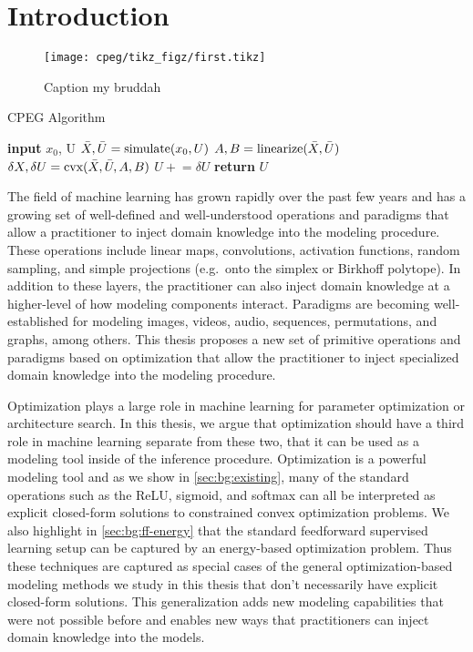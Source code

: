 \chapter{Introduction}

\begin{figure}
    \centering
    \texttt{[image: cpeg/tikz\_figz/first.tikz]}
    \caption{Caption my bruddah}
    \label{fig:enter-label}
\end{figure}

  \begin{algorithm} 
	\begin{algorithmic}[1]
		\caption{CPEG Algorithm}\label{alg:flight}
		\State \textbf{input} $x_0$, U  
    		\State $\Bar{X}, \Bar{U} = \text{simulate}(x_0,U)$ 
    		\State $A,B = \text{linearize}(\Bar{X}, \Bar{U})$ 
    		\State $\delta X,\delta U = \text{cvx}(\Bar{X}, \Bar{U}, A, B)$  
    	    \State $U \mathrel{+}= \delta U $ 
		\EndWhile
		\State \textbf{return} $U$ 
	\end{algorithmic}
\end{algorithm}

The field of machine learning has grown rapidly over the past few
years and has a growing set of well-defined and
well-understood operations and paradigms that allow
a practitioner to inject domain
knowledge into the modeling procedure.
These operations include linear maps, convolutions,
activation functions, random sampling, and
simple projections (e.g.~onto the simplex or Birkhoff polytope).
In addition to these layers, the practitioner can also
inject domain knowledge at a higher-level of
how modeling components interact.
Paradigms are becoming well-established for modeling
images, videos, audio, sequences, permutations, and graphs,
among others.
This thesis proposes a new set of primitive operations and
paradigms based on optimization that allow the practitioner
to inject specialized domain knowledge into the modeling procedure.

Optimization plays a large role in machine learning for
parameter optimization or architecture search.
In this thesis, we argue that optimization should have a third
role in machine learning separate from these two,
that it can be used as a modeling tool inside of
the inference procedure.
Optimization is a powerful modeling tool and as we show in
\cref{sec:bg:existing}, many of the standard operations such
as the ReLU, sigmoid, and softmax can all be interpreted
as explicit closed-form solutions to constrained convex
optimization problems.
We also highlight in \cref{sec:bg:ff-energy} that the standard
feedforward supervised learning setup can be captured
by an energy-based optimization problem.
Thus these techniques are captured as special cases of the
general optimization-based modeling methods we study in
this thesis that don't necessarily have explicit
closed-form solutions.
This generalization adds new modeling capabilities that
were not possible before and enables new ways that
practitioners can inject domain knowledge into the models.

